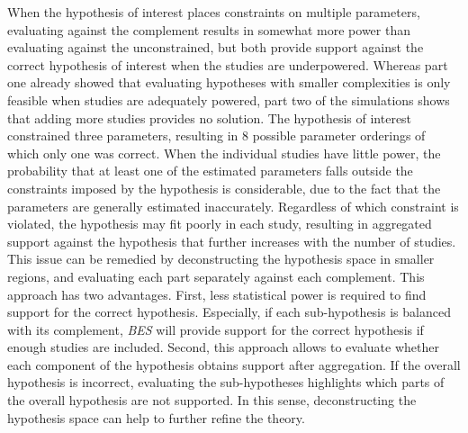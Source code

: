 \documentclass[
]{interact}
\begin{document}
When the hypothesis of interest places constraints on multiple
parameters, evaluating against the complement results in somewhat more
power than evaluating against the unconstrained, but both provide
support against the correct hypothesis of interest when the studies are
underpowered. Whereas part one already showed that evaluating hypotheses
with smaller complexities is only feasible when studies are adequately
powered, part two of the simulations shows that adding more studies
provides no solution. The hypothesis of interest constrained three
parameters, resulting in 8 possible parameter orderings of which only
one was correct. When the individual studies have little power, the
probability that at least one of the estimated parameters falls outside
the constraints imposed by the hypothesis is considerable, due to the
fact that the parameters are generally estimated inaccurately.
Regardless of which constraint is violated, the hypothesis may fit
poorly in each study, resulting in aggregated support against the
hypothesis that further increases with the number of studies. This issue
can be remedied by deconstructing the hypothesis space in smaller
regions, and evaluating each part separately against each complement.
This approach has two advantages. First, less statistical power is
required to find support for the correct hypothesis. Especially, if each
sub-hypothesis is balanced with its complement, \emph{BES} will provide
support for the correct hypothesis if enough studies are included.
Second, this approach allows to evaluate whether each component of the
hypothesis obtains support after aggregation. If the overall hypothesis
is incorrect, evaluating the sub-hypotheses highlights which parts of
the overall hypothesis are not supported. In this sense, deconstructing
the hypothesis space can help to further refine the theory.
\end{document}

